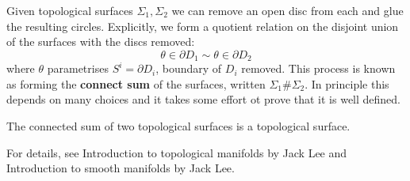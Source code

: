 \documentclass[a4paper,11pt]{article}
\begin{document}
\begin{example}
	Given topological surfaces \( \Sigma_1, \Sigma_2 \) we can remove an open disc from each and glue the resulting circles.
	Explicitly, we form a quotient relation on the disjoint union of the surfaces with the discs removed: 
	\[
		\theta\in \partial D_1 \sim \theta \in \partial D_2
	\]
	where $\theta$ parametrises $S^i=\partial D_i$, boundary of $D_i$ removed.
	This process is known as forming the \textbf{connect sum} of the surfaces, written \( \Sigma_1 \# \Sigma_2 \). In principle this depends on many choices and it takes some effort ot prove that it is well defined. 
	\begin{lemma}
		The connected sum of two topological surfaces is a topological surface.
	\end{lemma}
	For details, see Introduction to topological manifolds by Jack Lee and Introduction to smooth manifolds by Jack Lee. 
\end{example}
\end{document}
